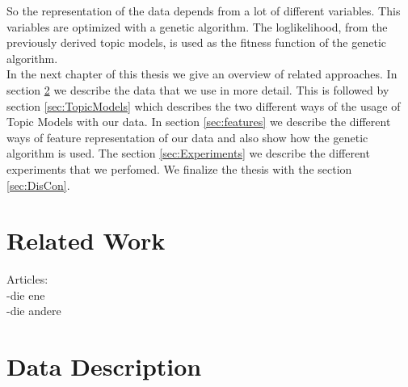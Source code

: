 \documentclass[11pt,a4paper]{article}
\begin{document}
So the representation of the data depends from a lot of different variables. This variables are optimized with a genetic algorithm. The loglikelihood, from the previously derived topic models, is used as the fitness function of the genetic algorithm.\\

In the next chapter of this thesis we give an overview of related approaches. In section \ref{sec:DataDesc} we describe the data that we use in more detail. This is followed by section \ref{sec:TopicModels} which describes the two different ways of the usage of Topic Models with our data. In section \ref{sec:features} we describe the different ways of feature representation of our data and also show how the genetic algorithm is used. The section \ref{sec:Experiments} we describe the different experiments that we perfomed. We finalize the thesis with the section \ref{sec:DisCon}.


% 
% 
% 


\section{Related Work}
Articles:\\
-die ene\\
-die andere


\section{Data Description}
\label{sec:DataDesc}
\end{document}
